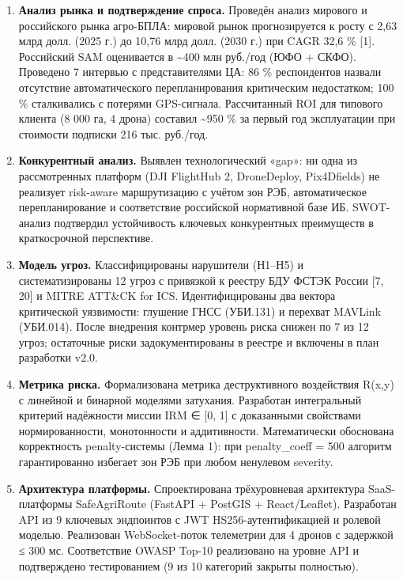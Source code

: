 \begin{enumerate}
\def\labelenumi{\arabic{enumi}.}
\item
  \textbf{Анализ рынка и подтверждение спроса.} Проведён анализ мирового и российского рынка агро-БПЛА: мировой рынок прогнозируется к росту с 2,63 млрд долл. (2025 г.) до 10,76 млрд долл. (2030 г.) при CAGR 32,6 \% {[}1{]}. Российский SAM оценивается в \textasciitilde400 млн руб./год (ЮФО + СКФО). Проведено 7 интервью с представителями ЦА: 86 \% респондентов назвали отсутствие автоматического перепланирования критическим недостатком; 100 \% сталкивались с потерями GPS-сигнала. Рассчитанный ROI для типового клиента (8 000 га, 4 дрона) составил \textasciitilde950 \% за первый год эксплуатации при стоимости подписки 216 тыс. руб./год.
\item
  \textbf{Конкурентный анализ.} Выявлен технологический «gap»: ни одна из рассмотренных платформ (DJI FlightHub 2, DroneDeploy, Pix4Dfields) не реализует risk-aware маршрутизацию с учётом зон РЭБ, автоматическое перепланирование и соответствие российской нормативной базе ИБ. SWOT-анализ подтвердил устойчивость ключевых конкурентных преимуществ в краткосрочной перспективе.
\item
  \textbf{Модель угроз.} Классифицированы нарушители (Н1--Н5) и систематизированы 12 угроз с привязкой к реестру БДУ ФСТЭК России {[}7, 20{]} и MITRE ATT\&CK for ICS. Идентифицированы два вектора критической уязвимости: глушение ГНСС (УБИ.131) и перехват MAVLink (УБИ.014). После внедрения контрмер уровень риска снижен по 7 из 12 угроз; остаточные риски задокументированы в реестре и включены в план разработки v2.0.
\item
  \textbf{Метрика риска.} Формализована метрика деструктивного воздействия R(x,y) с линейной и бинарной моделями затухания. Разработан интегральный критерий надёжности миссии IRM ∈ {[}0, 1{]} с доказанными свойствами нормированности, монотонности и аддитивности. Математически обоснована корректность penalty-системы (Лемма 1): при penalty\_coeff = 500 алгоритм гарантированно избегает зон РЭБ при любом ненулевом severity.
\item
  \textbf{Архитектура платформы.} Спроектирована трёхуровневая архитектура SaaS-платформы SafeAgriRoute (FastAPI + PostGIS + React/Leaflet). Разработан API из 9 ключевых эндпоинтов с JWT HS256-аутентификацией и ролевой моделью. Реализован WebSocket-поток телеметрии для 4 дронов с задержкой ≤ 300 мс. Соответствие OWASP Top-10 реализовано на уровне API и подтверждено тестированием (9 из 10 категорий закрыты полностью).

\end{enumerate}
